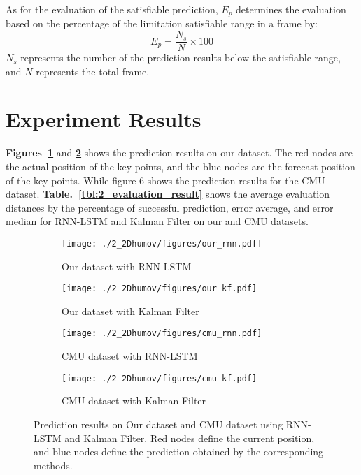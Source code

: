 As for the evaluation of the satisfiable prediction, $E_p$ determines the evaluation based on the percentage of the limitation satisfiable range in a frame by:
\begin{equation}\label{eq:2_range_limit}
    E_p = \frac{N_s}{N} \times 100
\end{equation}
$N_s$ represents the number of the prediction results below the satisfiable range, and $N$ represents the total frame.

\section{Experiment Results}\label{2:results}
\textbf{Figures~\ref{fig:2_our_rnn}} and \textbf{\ref{fig:2_our_kf}} shows the prediction results on our dataset. The red nodes are the actual position of the key points, and the blue nodes are the forecast position of the key points. While figure 6 shows the prediction results for the CMU dataset. \textbf{Table.~\ref{tbl:2_evaluation_result}} shows the average evaluation distances by the percentage of successful prediction, error average, and error median for RNN-LSTM and Kalman Filter on our and CMU datasets.

\begin{figure}
    \centering
    \begin{subfigure}[t]{0.45\textwidth}
        \centering
        \texttt{[image: ./2\_2Dhumov/figures/our\_rnn.pdf]}
        \caption{Our dataset with RNN-LSTM}
        \label{fig:2_our_rnn}
    \end{subfigure}
    \begin{subfigure}[t]{0.45\textwidth}
        \centering
        \texttt{[image: ./2\_2Dhumov/figures/our\_kf.pdf]}
        \caption{Our dataset with Kalman Filter}
        \label{fig:2_our_kf}
    \end{subfigure}
    \begin{subfigure}[t]{0.45\textwidth}
        \centering
        \texttt{[image: ./2\_2Dhumov/figures/cmu\_rnn.pdf]}
        \caption{CMU dataset with RNN-LSTM}
        \label{fig:2_cmu_rnn}
    \end{subfigure}
    \begin{subfigure}[t]{0.45\textwidth}
        \centering
        \texttt{[image: ./2\_2Dhumov/figures/cmu\_kf.pdf]}
        \caption{CMU dataset with Kalman Filter}
        \label{fig:2_cmu_kf}
    \end{subfigure}
    \caption{Prediction results on Our dataset and CMU dataset using RNN-LSTM and Kalman Filter. Red nodes define the current position, and blue nodes define the prediction obtained by the corresponding methods.}
    \label{fig:2_qualitative_results}
\end{figure}

